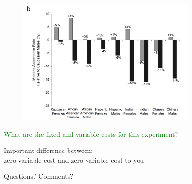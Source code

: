\documentclass[aspectratio=169]{beamer}
\begin{document}
\begin{frame}

\begin{figure}
  \centering
  \includegraphics[width=0.8\textwidth]{figures/milkman_temporal_2012_fig2b.png}
\end{figure}

\end{frame}
\begin{frame}

\textcolor{green}{What are the fixed and variable costs for this experiment?}

\end{frame}
\begin{frame}

{\Large
\begin{center}
Important difference between:\\
zero variable cost and zero variable cost to you
\end{center}
}

\end{frame}
\begin{frame}

Questions?  Comments?

\end{frame}
\end{document}
